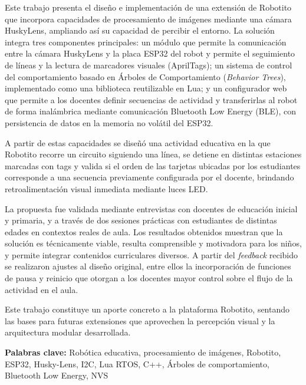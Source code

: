 \documentclass{prgrado}
\begin{document}
Este trabajo presenta el diseño e implementación de una extensión de Robotito que incorpora capacidades de procesamiento de imágenes mediante una cámara HuskyLens, ampliando así su capacidad de percibir el entorno. La solución integra tres componentes principales: un módulo que permite la comunicación entre la cámara HuskyLens y la placa ESP32 del robot y permite el seguimiento de líneas y la lectura de marcadores visuales (AprilTags); un sistema de control del comportamiento basado en Árboles de Comportamiento (\textit{Behavior Trees}), implementado como una biblioteca reutilizable en Lua; y un configurador web que permite a los docentes definir secuencias de actividad y transferirlas al robot de forma inalámbrica mediante comunicación Bluetooth Low Energy (BLE), con persistencia de datos en la memoria no volátil del ESP32.

A partir de estas capacidades se diseñó una actividad educativa en la que Robotito recorre un circuito siguiendo una línea, se detiene en distintas estaciones marcadas con tags y valida si el orden de las tarjetas ubicadas por los estudiantes corresponde a una secuencia previamente configurada por el docente, brindando retroalimentación visual inmediata mediante luces LED.

La propuesta fue validada mediante entrevistas con docentes de educación inicial y primaria, y a través de dos sesiones prácticas con estudiantes de distintas edades en contextos reales de aula. Los resultados obtenidos muestran que la solución es técnicamente viable, resulta comprensible y motivadora para los niños, y permite integrar contenidos curriculares diversos. A partir del \textit{feedback} recibido se realizaron ajustes al diseño original, entre ellos la incorporación de funciones de pausa y reinicio que otorgan a los docentes mayor control sobre el flujo de la actividad en el aula.

Este trabajo constituye un aporte concreto a la plataforma Robotito, sentando las bases para futuras extensiones que aprovechen la percepción visual y la arquitectura modular desarrollada.

\vspace{1cm}
\noindent\textbf{Palabras clave:} Robótica educativa,  procesamiento de imágenes, Robotito, ESP32, Husky-Lens, I2C, Lua RTOS, C++, Árboles de comportamiento, Bluetooth Low Energy, NVS



\tableofcontents
\newpage
\end{document}
